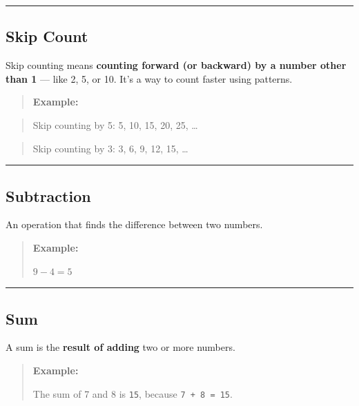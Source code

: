 \documentclass[
  letterpaper,
  DIV=11,
  numbers=noendperiod]{scrreprt}
\begin{document}
\begin{center}\rule{0.5\linewidth}{0.5pt}\end{center}

\subsection*{Skip Count}\label{glossary-skip-count}

Skip counting means \textbf{counting forward (or backward) by a number
other than 1} --- like 2, 5, or 10. It's a way to count faster using
patterns.

\begin{quote}
\textbf{Example:}
\end{quote}

\begin{quote}
Skip counting by 5: 5, 10, 15, 20, 25, \ldots{}
\end{quote}

\begin{quote}
Skip counting by 3: 3, 6, 9, 12, 15, \ldots{}
\end{quote}

\begin{center}\rule{0.5\linewidth}{0.5pt}\end{center}

\subsection*{Subtraction}\label{glossary-subtraction}

An operation that finds the difference between two numbers.

\begin{quote}
\textbf{Example:}

\(9 - 4 = 5\)
\end{quote}

\begin{center}\rule{0.5\linewidth}{0.5pt}\end{center}

\subsection*{Sum}\label{glossary-sum}

A sum is the \textbf{result of adding} two or more numbers.

\begin{quote}
\textbf{Example: }

The sum of 7 and 8 is \texttt{15}, because \texttt{7\ +\ 8\ =\ 15}.
\end{quote}
\end{document}
